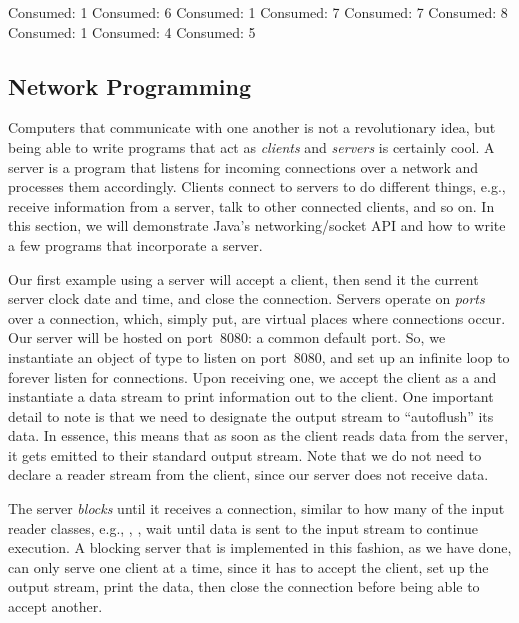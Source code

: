 \begin{verbnobox}[\small]
Consumed: 1
Consumed: 6
Consumed: 1
Consumed: 7
Consumed: 7
Consumed: 8
Consumed: 1
Consumed: 4
Consumed: 5
\end{verbnobox}

\subsection{Network Programming}

Computers that communicate with one another is not a revolutionary idea, but being able to write programs that act as \emph{clients} and \emph{servers} is certainly cool. 
A server is a program that listens for incoming connections over a network and processes them accordingly. 
Clients connect to servers to do different things, e.g., receive information from a server, talk to other connected clients, and so on. 
In this section, we will demonstrate Java's networking/socket API and how to write a few programs that incorporate a server.

Our first example using a server will accept a client, then send it the current server clock date and time, and close the connection. 
Servers operate on \emph{ports} over a connection, which, simply put, are virtual places where connections occur. 
Our server will be hosted on port~$8080$: a common default port. 
So, we instantiate an object of type  to listen on port~$8080$, and set up an infinite loop to forever listen for connections. 
Upon receiving one, we accept the client as a  and instantiate a data stream to print information out to the client. 
One important detail to note is that we need to designate the  output stream to ``autoflush'' its data. 
In essence, this means that as soon as the client reads data from the server, it gets emitted to their standard output stream. 
Note that we do not need to declare a reader stream from the client, since our server does not receive data.

The server \emph{blocks} until it receives a connection, similar to how many of the input reader classes, e.g., , , wait until data is sent to the input stream to continue execution. 
A blocking server that is implemented in this fashion, as we have done, can only serve one client at a time, since it has to accept the client, set up the output stream, print the data, then close the connection before being able to accept another.

